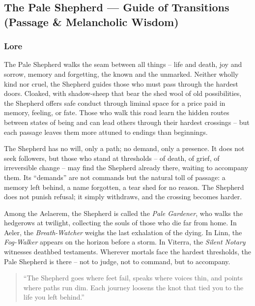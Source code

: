 
\subsection{The Pale Shepherd --- Guide of Transitions (Passage \& Melancholic Wisdom)}

\subsubsection*{Lore}
The Pale Shepherd walks the seam between all things -- life and death, joy and sorrow, memory and forgetting, the known and the unmarked. Neither wholly kind nor cruel, the Shepherd guides those who must pass through the hardest doors. Cloaked, with shadow-sheep that bear the shed wool of old possibilities, the Shepherd offers safe conduct through liminal space for a price paid in memory, feeling, or fate. Those who walk this road learn the hidden routes between states of being and can lead others through their hardest crossings -- but each passage leaves them more attuned to endings than beginnings.

The Shepherd has no will, only a path; no demand, only a presence. It does not seek followers, but those who stand at thresholds -- of death, of grief, of irreversible change -- may find the Shepherd already there, waiting to accompany them. Its ``demands'' are not commands but the natural toll of passage: a memory left behind, a name forgotten, a tear shed for no reason. The Shepherd does not punish refusal; it simply withdraws, and the crossing becomes harder.

Among the Aelaerem, the Shepherd is called the \textit{Pale Gardener}, who walks the hedgerows at twilight, collecting the souls of those who die far from home. In Aeler, the \textit{Breath-Watcher} weighs the last exhalation of the dying. In Linn, the \textit{Fog-Walker} appears on the horizon before a storm. In Viterra, the \textit{Silent Notary} witnesses deathbed testaments. Wherever mortals face the hardest thresholds, the Pale Shepherd is there -- not to judge, not to command, but to accompany.

\begin{quote}
``The Shepherd goes where feet fail, speaks where voices thin, and points where paths run dim. Each journey loosens the knot that tied you to the life you left behind.''
\end{quote}

